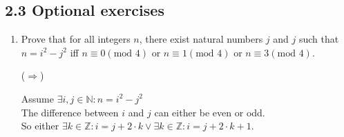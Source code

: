 \documentclass[10pt,\jkfside,a4paper]{article}
\begin{document}
\subsection*{2.3 Optional exercises}

\begin{enumerate}

\item Prove that for all integers $n$, there exist natural numbers $j$ and $j$ such that 
$n=i^2-j^2$ iff $n\equiv 0 (\text{mod } 4)$ or $n\equiv 1 (\text{mod } 4)$ or $n\equiv 3 (\text{mod } 4)$.


($\Longrightarrow$)

Assume $\exists i, j \in \mathbb{N}: n = i^2 - j^2$\\
The difference between $i$ and $j$ can either be even or odd.\\
So either $\exists k \in \mathbb{Z}: i = j + 2\cdot k \vee \exists k \in \mathbb{Z}: i = j + 2\cdot k + 1$.


\end{enumerate}
\end{document}
